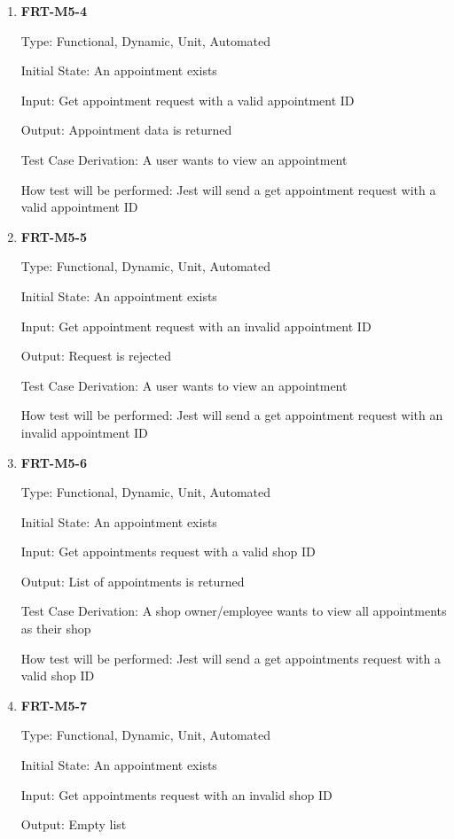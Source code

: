 \documentclass[12pt, titlepage]{article}
\begin{document}
\begin{enumerate}
	\item \textbf{FRT-M5-4}

	      Type: Functional, Dynamic, Unit, Automated

	      Initial State: An appointment exists

	      Input: Get appointment request with a valid appointment ID

	      Output: Appointment data is returned

	      Test Case Derivation: A user wants to view an appointment

	      How test will be performed: Jest will send a get appointment request with a valid appointment ID

	\item \textbf{FRT-M5-5}

	      Type: Functional, Dynamic, Unit, Automated

	      Initial State: An appointment exists

	      Input: Get appointment request with an invalid appointment ID

	      Output: Request is rejected

	      Test Case Derivation: A user wants to view an appointment

	      How test will be performed: Jest will send a get appointment request with an invalid appointment ID

	\item \textbf{FRT-M5-6}

	      Type: Functional, Dynamic, Unit, Automated

	      Initial State: An appointment exists

	      Input: Get appointments request with a valid shop ID

	      Output: List of appointments is returned

	      Test Case Derivation: A shop owner/employee wants to view all appointments as their shop

	      How test will be performed: Jest will send a get appointments request with a valid shop ID

	\item \textbf{FRT-M5-7}

	      Type: Functional, Dynamic, Unit, Automated

	      Initial State: An appointment exists

	      Input: Get appointments request with an invalid shop ID

	      Output: Empty list


\end{enumerate}
\end{document}
